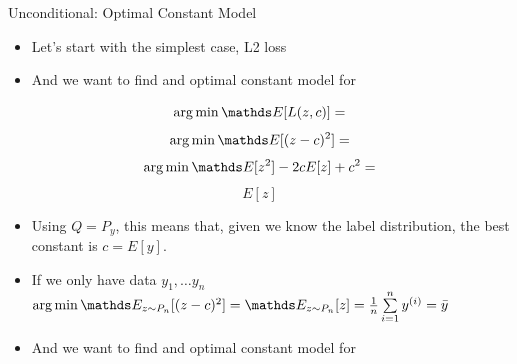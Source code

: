 \documentclass[11pt,compress,t,notes=noshow, xcolor=table]{beamer}
\begin{document}
\begin{vbframe}{Unconditional: Optimal Constant Model}

\begin{itemize}
\item Let's start with the simplest case, L2 loss
\item And we want to find and optimal constant model for 

\end{itemize}

$$ \argmin \E [L(z, c)] = $$
$$ \argmin \E [(z - c)^2] = $$
$$ \argmin \E [z^2] - 2cE[z] + c^2 = $$
$$ E[z] $$

\begin{itemize}
\item Using $Q = P_y$, this means that, given we know the label distribution,
the best constant is $c = E[y]$.
\item If we only have data $y_1, \ldots y_n$
$\argmin \E_{z \sim P_n} [(z - c)^2] = \E_{z \sim P_n}[z] = \frac{1}{n} \sumin \yi = \bar{y}$


\item And we want to find and optimal constant model for 

\end{itemize}


\end{vbframe}
\end{document}
